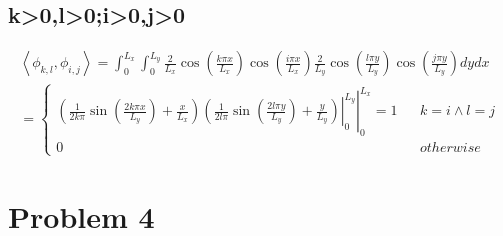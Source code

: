 \documentclass[12pt]{article}
\begin{document}
\subsection*{k>0,l>0;i>0,j>0}
\begin{multline}
\left<\phi_{k,l},\phi_{i,j}\right>=\int_{0}^{L_x} \int_{0}^{L_y} \frac{2}{L_x}\cos(\frac{k \pi x}{L_x})\cos(\frac{i \pi x}{L_x}) \frac{2}{L_y}\cos(\frac{l \pi y}{L_y})\cos(\frac{j \pi y}{L_y})dydx \\
=\left\{\begin{array}{rcl}
\left.\left.\left(\frac{1}{2k \pi}\sin(\frac{2k  \pi x}{L_y})+ \frac{x}{L_x} \right) \left(\frac{1}{2l \pi}\sin(\frac{2l  \pi y}{L_y})+ \frac{y}{L_y} \right)\right|_{0}^{L_y} \right|_{0}^{L_x}=1 & & {k=i \land l=j}\\
0 & & {otherwise}
\end{array}\right.
\label{eqn:prob3_32_42}
\end{multline}



\section*{Problem 4}
 

\pagebreak
\appendix
\end{document}
